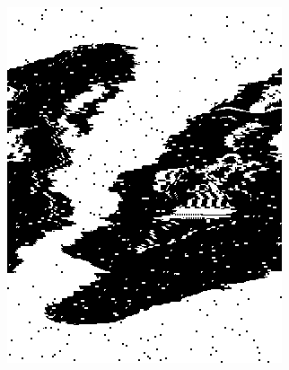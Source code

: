 \documentclass[]{article}
\begin{document}
\begin{section}
\begin{figure}
            \begin{subfigure}{0.4\textwidth}
                \centering
                \includegraphics[width=\textwidth]{vraag3_3/compressed.png}
                \caption{}
                \label{fig:3_3:compressed}
            \end{subfigure}
            \begin{subfigure}{0.4\textwidth}
                \centering

\end{subfigure}
\end{figure}
\end{section}
\end{document}
